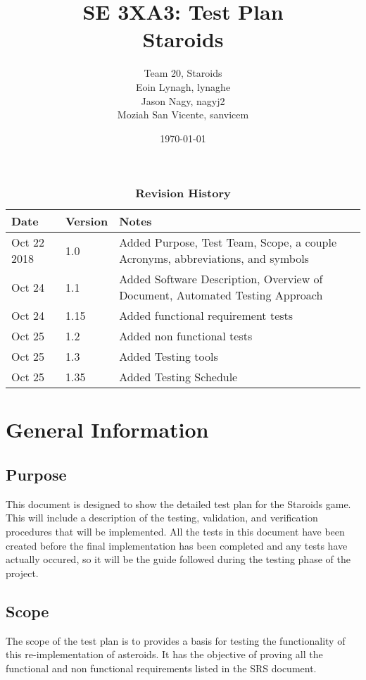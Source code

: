 \documentclass[12pt, titlepage]{article}
\title{SE 3XA3: Test Plan\\Staroids}
\author{Team 20, Staroids
		\\ Eoin Lynagh, lynaghe
		\\ Jason Nagy, nagyj2
		\\ Moziah San Vicente, sanvicem
}
\date{\today}
\begin{document}
\maketitle

\tableofcontents
\listoftables
\listoffigures

\begin{table}[bp]
\caption{\bf Revision History}
\begin{tabularx}{\textwidth}{p{3cm}p{2cm}X}
\toprule {\bf Date} & {\bf Version} & {\bf Notes}\\
\midrule
Oct 22 2018 & 1.0 & Added Purpose, Test Team, Scope, a couple Acronyms, abbreviations, and symbols\\
Oct 24 & 1.1 & Added Software Description, Overview of Document, Automated Testing Approach\\
Oct 24 & 1.15 & Added functional requirement tests\\
Oct 25 & 1.2 & Added non functional tests\\
Oct 25 & 1.3 & Added Testing tools\\
Oct 25 & 1.35 & Added Testing Schedule\\
\bottomrule
\end{tabularx}
\end{table}

\newpage


\section{General Information}

\subsection{Purpose}
This document is designed to show the detailed test plan for the Staroids game. This will include a description of the testing, validation, and verification procedures that will be implemented. All the tests in this document have been created before the final implementation has been completed and any tests have actually occured, so it will be the guide followed during the testing phase of the project.

\subsection{Scope}
The scope of the test plan is to provides a basis for testing the functionality of this re-implementation of asteroids. It has the objective of proving all the functional and non functional requirements listed in the SRS document.
\end{document}
